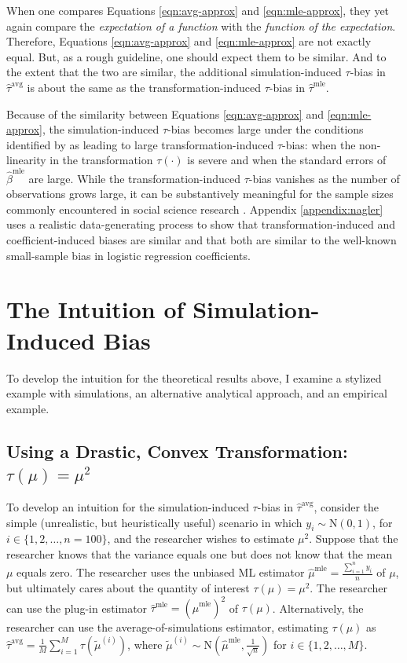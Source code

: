 \documentclass[12pt]{article}
\begin{document}
When one compares Equations \ref{eqn:avg-approx} and \ref{eqn:mle-approx}, they yet again compare the \textit{expectation of a function} with the \textit{function of the expectation}.
Therefore, Equations \ref{eqn:avg-approx} and \ref{eqn:mle-approx} are not exactly equal.
But, as a rough guideline, one should expect them to be similar.
And to the extent that the two are similar, the additional simulation-induced $\tau$-bias in $\hat{\tau}^\text{avg}$ is about the same as the transformation-induced $\tau$-bias in $\hat{\tau}^\text{mle}$. 

Because of the similarity between Equations \ref{eqn:avg-approx} and \ref{eqn:mle-approx}, the simulation-induced $\tau$-bias becomes large under the conditions identified by \cite{Rainey2017} as leading to large transformation-induced $\tau$-bias: when the non-linearity in the transformation $\tau(\cdot)$ is severe and when the standard errors of $\hat{\beta}^\text{mle}$ are large.
While the transformation-induced $\tau$-bias vanishes as the number of observations grows large, it can be substantively meaningful for the sample sizes commonly encountered in social science research \citep{Rainey2017}. Appendix \ref{appendix:nagler} uses a realistic data-generating process to show that transformation-induced and coefficient-induced biases are similar and that both are similar to the well-known small-sample bias in logistic regression coefficients.

\section*{The Intuition of Simulation-Induced Bias}

To develop the intuition for the theoretical results above, I examine a stylized example with simulations, an alternative analytical approach, and an empirical example.

\subsection*{Using a Drastic, Convex Transformation: $\tau(\mu) = \mu^2$}

To develop an intuition for the simulation-induced $\tau$-bias in $\hat{\tau}^\text{avg}$, consider the simple (unrealistic, but heuristically useful) scenario in which $y_i \sim \text{N}(0, 1)$, for $i \in \{1, 2, \ldots, n = 100\}$, and the researcher wishes to estimate $\mu^2$. Suppose that the researcher knows that the variance equals one but does not know that the mean $\mu$ equals zero. The researcher uses the unbiased ML estimator $\hat{\mu}^\text{mle} = \frac{\sum_{i=1}^n y_i}{n}$ of $\mu$, but ultimately cares about the quantity of interest $\tau(\mu) = \mu^2$. The researcher can use the plug-in estimator $\hat{\tau}^\text{mle} = \left( \hat{\mu}^\text{mle} \right) ^2$ of $\tau(\mu)$. Alternatively, the researcher can use the average-of-simulations estimator, estimating $\tau(\mu)$ as $\hat{\tau}^\text{avg} = \frac{1}{M} \sum_{i = 1}^M \tau \left( \tilde{\mu}^{(i)} \right)$, where $\tilde{\mu}^{(i)} \sim \text{N} \left( \hat{\mu}^\text{mle}, \frac{1}{\sqrt{n}} \right)$ for $i \in \{1, 2,\ldots, M\}$.
\end{document}
